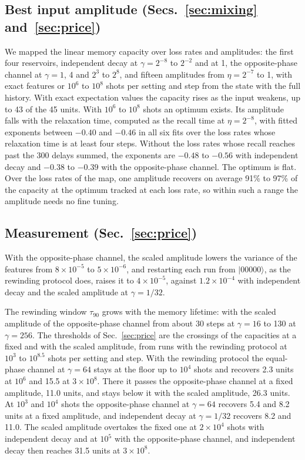 \subsection{Best input amplitude (Secs.~\ref{sec:mixing} and~\ref{sec:price})}
\label{app:num-amplitude}
We mapped the linear memory capacity over loss rates and amplitudes: the first four reservoirs, independent decay at
$\gamma=2^{-8}$ to $2^{-2}$ and at 1, the opposite-phase channel at $\gamma=1$, 4 and $2^3$ to $2^8$, and fifteen
amplitudes from $\eta=2^{-7}$ to 1, with exact features or $10^6$ to $10^8$ shots per setting and step from
the state with the full history. With exact expectation values the capacity rises as the input weakens, up to 43 of the 45
units. With $10^6$ to $10^8$ shots an optimum exists. Its amplitude falls with the relaxation time, computed as the recall
time at $\eta=2^{-8}$, with fitted exponents between $-0.40$ and $-0.46$ in all six fits over the
loss rates whose relaxation time is at least four steps. Without the loss rates whose recall reaches past the 300 delays
summed, the exponents are $-0.48$ to $-0.56$ with independent decay and $-0.38$ to $-0.39$ with the opposite-phase
channel. The optimum is flat. Over the loss rates of the map, one amplitude recovers on average 91\% to 97\% of the
capacity at the optimum tracked at each loss rate, so within such a range the amplitude needs no fine tuning.

\subsection{Measurement (Sec.~\ref{sec:price})}
\label{app:num-measurement}
With the opposite-phase channel, the scaled amplitude lowers the variance of the features from $8\times10^{-5}$ to $5\times10^{-6}$,
and restarting each run from $|00000\rangle$, as the rewinding protocol does, raises it to $4\times10^{-5}$, against
$1.2\times10^{-4}$ with independent decay and the scaled amplitude at $\gamma=1/32$.

The rewinding window $\tau_{90}$ grows with the memory lifetime: with the scaled amplitude of the
opposite-phase channel from about 30 steps at $\gamma=16$ to 130 at $\gamma=256$. The thresholds of Sec.~\ref{sec:price}
are the crossings of the capacities at a fixed and with the scaled amplitude, from runs with the rewinding protocol at $10^3$ to
$10^{8.5}$ shots per setting and step. With the rewinding protocol the equal-phase channel at $\gamma=64$ stays at the
floor up to $10^4$ shots and recovers 2.3 units at $10^6$ and 15.5 at $3\times10^8$. There it passes the
opposite-phase channel at a fixed amplitude, 11.0 units, and stays below it with the scaled amplitude, 26.3 units.
At $10^3$ and $10^4$ shots the opposite-phase channel at $\gamma=64$ recovers 5.4 and 8.2 units at a fixed amplitude,
and independent decay at $\gamma=1/32$ recovers 8.2 and 11.0. The scaled amplitude overtakes the fixed one at
$2\times10^4$ shots with independent decay and at $10^5$ with the opposite-phase channel, and independent decay then
reaches 31.5 units at $3\times10^8$.


